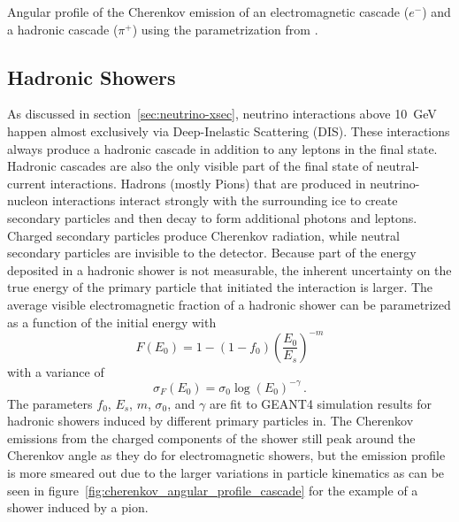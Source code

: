 \begin{marginfigure}
    \centering
    
    \caption{Angular profile of the Cherenkov emission of an electromagnetic cascade ($e^-$) and a hadronic cascade ($\pi^+$) using the parametrization from \cite{RADEL2013102}.}
    \label{fig:cherenkov_angular_profile_cascade}
\end{marginfigure}

\subsection{Hadronic Showers}
\label{sec:had-showers}
As discussed in section~\ref{sec:neutrino-xsec}, neutrino interactions above 10~GeV happen almost exclusively via Deep-Inelastic Scattering (DIS). These interactions always produce a hadronic cascade in addition to any leptons in the final state. Hadronic cascades are also the only visible part of the final state of neutral-current interactions. Hadrons (mostly Pions) that are produced in neutrino-nucleon interactions interact strongly with the surrounding ice to create secondary particles and then decay to form additional photons and leptons. Charged secondary particles produce Cherenkov radiation, while neutral secondary particles are invisible to the detector. Because part of the energy deposited in a hadronic shower is not measurable, the inherent uncertainty on the true energy of the primary particle that initiated the interaction is larger. The average visible electromagnetic fraction of a hadronic shower can be parametrized\cite{RADEL2013102} as a function of the initial energy with
\begin{equation}
    F(E_0) = 1 - (1-f_0)\left(\frac{E_0}{E_s}\right)^{-m}
\end{equation}
with a variance of
\begin{equation}
    \sigma_F(E_0) = \sigma_0 \log(E_0)^{-\gamma}\,.
\end{equation}
The parameters $f_0$, $E_s$, $m$, $\sigma_0$, and $\gamma$ are fit to GEANT4 simulation results for hadronic showers induced by different primary particles in\cite{RADEL2013102}.
The Cherenkov emissions from the charged components of the shower still peak around the Cherenkov angle as they do for electromagnetic showers, but the emission profile is more smeared out due to the larger variations in particle kinematics as can be seen in figure~\ref{fig:cherenkov_angular_profile_cascade} for the example of a shower induced by a pion.
